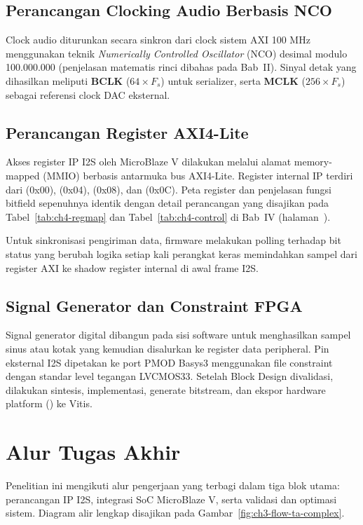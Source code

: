 \subsection{Perancangan Clocking Audio Berbasis NCO}
Clock audio diturunkan secara sinkron dari clock sistem AXI 100 MHz menggunakan teknik \textit{Numerically Controlled Oscillator} (NCO) desimal modulo 100.000.000 (penjelasan matematis rinci dibahas pada Bab~II). Sinyal detak yang dihasilkan meliputi \textbf{BCLK} ($64 \times F_s$) untuk serializer, serta \textbf{MCLK} ($256 \times F_s$) sebagai referensi clock DAC eksternal.

\subsection{Perancangan Register AXI4-Lite}
Akses register IP I2S oleh MicroBlaze V dilakukan melalui alamat memory-mapped (MMIO) berbasis antarmuka bus AXI4-Lite. Register internal IP terdiri dari  (0x00),  (0x04),  (0x08), dan  (0x0C). Peta register dan penjelasan fungsi bitfield sepenuhnya identik dengan detail perancangan yang disajikan pada Tabel~\ref{tab:ch4-regmap} dan Tabel~\ref{tab:ch4-control} di Bab~IV (halaman~\pageref{tab:ch4-regmap}).

Untuk sinkronisasi pengiriman data, firmware melakukan polling terhadap bit status  yang berubah logika setiap kali perangkat keras memindahkan sampel dari register AXI ke shadow register internal di awal frame I2S.

\subsection{Signal Generator dan Constraint FPGA}
Signal generator digital dibangun pada sisi software untuk menghasilkan sampel sinus atau kotak yang kemudian disalurkan ke register data peripheral. Pin eksternal I2S dipetakan ke port PMOD Basys3 menggunakan file constraint  dengan standar level tegangan LVCMOS33. Setelah Block Design divalidasi, dilakukan sintesis, implementasi, generate bitstream, dan ekspor hardware platform () ke Vitis.

\section{Alur Tugas Akhir}

Penelitian ini mengikuti alur pengerjaan yang terbagi dalam tiga blok utama: perancangan IP I2S, integrasi SoC MicroBlaze V, serta validasi dan optimasi sistem. Diagram alir lengkap disajikan pada Gambar~\ref{fig:ch3-flow-ta-complex}.

